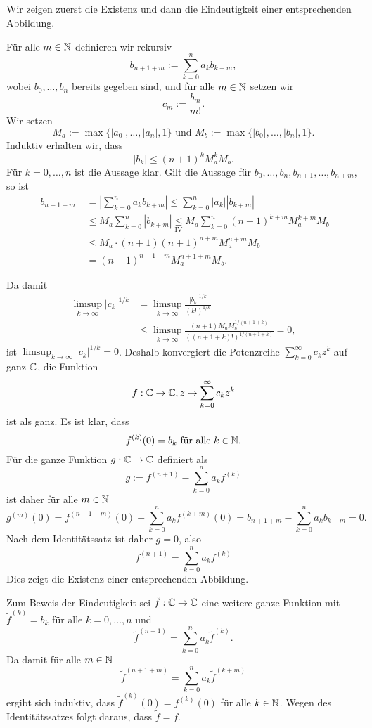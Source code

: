 \documentclass[a4paper,10pt]{article}
\begin{document}
\subsection{}
Wir zeigen zuerst die Existenz und dann die Eindeutigkeit einer entsprechenden Abbildung.

Für alle $m \in \mathbb{N}$ definieren wir rekursiv
\[
 b_{n+1+m} := \sum_{k=0}^n a_k b_{k+m},
\]
wobei $b_0, \ldots, b_n$ bereits gegeben sind, und für alle $m \in \mathbb{N}$ setzen wir
\[
 c_m := \frac{b_m}{m!}.
\]
Wir setzen
\[
 M_a := \max \{ |a_0|, \ldots, |a_n|, 1 \} \text{ und }
 M_b := \max \{ |b_0|, \ldots, |b_n|, 1 \}.
\]
Induktiv erhalten wir, dass
\[
 |b_k| \leq (n+1)^k M_a^k M_b.
\]
Für $k = 0, \ldots, n$ ist die Aussage klar. Gilt die Aussage für $b_0, \ldots, b_n, b_{n+1}, \ldots, b_{n+m}$, so ist
\begin{align*}
 |b_{n+1+m}|
 &= \left| \sum_{k=0}^n a_k b_{k+m} \right|
 \leq \sum_{k=0}^n |a_k| |b_{k+m}| \\
 &\leq M_a \sum_{k=0}^n |b_{k+m}|
 \underset{\text{IV}}\leq M_a \sum_{k=0}^n (n+1)^{k+m} M_a^{k+m} M_b \\
 &\leq M_a \cdot (n+1) (n+1)^{n+m} M_a^{n+m} M_b \\
 &= (n+1)^{n+1+m} M_a^{n+1+m} M_b.
\end{align*}

Da damit
\begin{align*}
 \limsup_{k \to \infty} |c_k|^{1/k}
 &= \limsup_{k \to \infty} \frac{|b_k|^{1/k}}{(k!)^{1/k}} \\
 &\leq \limsup_{k \to \infty} \frac{(n+1) M_a M_b^{1/(n+1+k)}}{((n+1+k)!)^{1/(n+1+k)}}
 = 0,
\end{align*}
ist $\limsup_{k \to \infty} |c_k|^{1/k} = 0$. Deshalb konvergiert die Potenzreihe $\sum_{k=0}^\infty c_k z^k$ auf ganz $\mathbb{C}$, die Funktion
\[
 f : \mathbb{C} \to \mathbb{C}, z \mapsto \sum_{k=0}^\infty c_k z^k
\]
ist als ganz. Es ist klar, dass
\[
 f^{(k)}(0) = b_k \text{ für alle } k \in \mathbb{N}.
\]
Für die ganze Funktion $g : \mathbb{C} \to \mathbb{C}$ definiert als
\[
 g := f^{(n+1)} - \sum_{k=0}^n a_k f^{(k)}
\]
ist daher für alle $m \in \mathbb{N}$
\[
 g^{(m)}(0)
 = f^{(n+1+m)}(0) - \sum_{k=0}^n a_k f^{(k+m)}(0)
 = b_{n+1+m} - \sum_{k=0}^n a_k b_{k+m}
 = 0.
\]
Nach dem Identitätssatz ist daher $g = 0$, also
\[
 f^{(n+1)} = \sum_{k=0}^n a_k f^{(k)}
\]
Dies zeigt die Existenz einer entsprechenden Abbildung.

Zum Beweis der Eindeutigkeit sei $\tilde{f} : \mathbb{C} \to \mathbb{C}$ eine weitere ganze Funktion mit $\tilde{f}^{(k)} = b_k$ für alle $k = 0, \ldots, n$ und
\[
 \tilde{f}^{(n+1)} = \sum_{k=0}^n a_k \tilde{f}^{(k)}.
\]
Da damit für alle $m \in \mathbb{N}$
\[
 \tilde{f}^{(n+1+m)} = \sum_{k=0}^n a_k \tilde{f}^{(k+m)}
\]
ergibt sich induktiv, dass $\tilde{f}^{(k)}(0) = f^{(k)}(0)$ für alle $k \in \mathbb{N}$. Wegen des Identitätssatzes folgt daraus, dass $\tilde{f} = f$.
\end{document}
